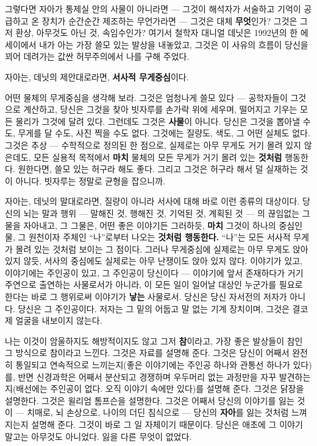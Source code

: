 그렇다면 자아가 통제실 안의 사물이 아니라면 — 그것이 해석자가 서술하고 기억이 공급하고 온 장치가 순간순간 제조하는 무언가라면 — 그것은 대체 \textbf{무엇}인가? 그것은 그저 환상, 아무것도 아닌 것, 속임수인가? 여기서 철학자 대니얼 데닛은 1992년의 한 에세이에서 내가 아는 가장 쓸모 있는 발상을 내놓았고, 그것은 이 사유의 흐름이 당신을 꾀어 데려가는 값싼 허무주의에서 나를 구해 주었다.

자아는, 데닛의 제안대로라면, \textbf{서사적 무게중심}이다.

어떤 물체의 무게중심을 생각해 보라. 그것은 엄청나게 쓸모 있다 — 공학자들이 그것으로 계산하고, 당신은 그것을 찾아 빗자루를 손가락 위에 세우며, 떨어지고 기우는 모든 물리가 그것에 달려 있다. 그런데도 그것은 \textbf{사물}이 아니다. 당신은 그것을 뽑아낼 수도, 무게를 달 수도, 사진 찍을 수도 없다. 그것에는 질량도, 색도, 그 어떤 실체도 없다. 그것은 추상 — 수학적으로 정의된 한 점으로, 실제로는 아무 무게도 거기 몰려 있지 않은데도, 모든 실용적 목적에서 \textbf{마치} 물체의 모든 무게가 거기 몰려 있는 \textbf{것처럼} 행동한다. 원한다면, 쓸모 있는 허구라 해도 좋다. 그리고 그것은 허구라 해서 덜 실재하는 것이 아니다. 빗자루는 정말로 균형을 잡으니까.

자아는, 데닛의 말대로라면, 질량이 아니라 서사에 대해 바로 이런 종류의 대상이다. 당신의 뇌는 말과 행위 — 말해진 것, 행해진 것, 기억된 것, 계획된 것 — 의 끊임없는 그물을 자아내고, 그 그물은, 어떤 좋은 이야기든 그러하듯, \textbf{마치} 그것이 하나의 중심인물, 그 원천이자 주체인 ``나''로부터 나오는 \textbf{것처럼 행동한다.} ``나''는 모든 서사적 무게가 몰려 있는 것처럼 보이는 그 점이다. 그러나 무게중심에 실제로는 아무 무게도 앉아 있지 않듯, 서사의 중심에도 실제로는 아무 난쟁이도 앉아 있지 않다. 이야기가 있고, 이야기에는 주인공이 있고, 그 주인공이 당신이다 — 이야기에 앞서 존재하다가 거기 주연으로 출연하는 사물로서가 아니라, 이 모든 일이 일어날 대상인 누군가를 필요로 한다는 바로 그 행위로써 이야기가 \textbf{낳는} 사물로서. 당신은 당신 자서전의 저자가 아니다. 당신은 그 주인공이다. 저자는 그 밑의 어둡고 말 없는 기계 장치이며, 그것은 결코 제 얼굴을 내보이지 않는다.

나는 이것이 암울하지도 해방적이지도 않고 그저 \textbf{참}이라고, 가장 좋은 발상들이 참인 그 방식으로 참이라고 느낀다. 그것은 자료를 설명해 준다. 그것은 당신이 어째서 완전히 통일되고 연속적으로 느끼는지(좋은 이야기에는 주인공 하나와 관통선 하나가 있다)를, 반면 신경과학은 어째서 분산되고 경쟁하며 우두머리 없는 과정만을 자꾸 발견하는지(배선에는 주인공이 없다. 오직 이야기 속에만 있다)를 설명해 준다. 그것은 닭장을 설명한다. 그것은 윌리엄 톰프슨을 설명한다. 그것은 어째서 당신의 이야기를 잃는 것이 — 치매로, 뇌 손상으로, 나이의 더딘 침식으로 — 당신의 \textbf{자아}를 잃는 것처럼 느껴지는지 설명해 준다. 그것이 바로 그 일 자체이기 때문이다. 당신은 애초에 그 이야기 말고는 아무것도 아니었다. 잃을 다른 무엇이 없었다.

